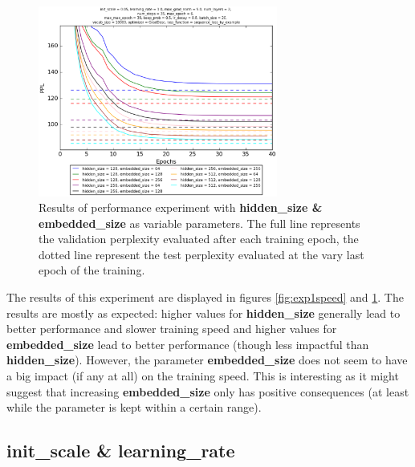 \documentclass[10pt,a4paper,titlepage]{article}
\begin{document}
\begin{figure}[H]
	\begin{center}
		\includegraphics[width=0.70\textwidth]{hidembperf.eps}
		\caption{Results of performance experiment with \textbf{hidden\_size \& embedded\_size} as variable parameters. The full line represents the validation perplexity evaluated after each training epoch, the dotted line represent the test perplexity evaluated at the vary last epoch of the training.}
		\label{fig:exp1perf}
	\end{center}	
\end{figure}

The results of this experiment are displayed in figures \ref{fig:exp1speed} and \ref{fig:exp1perf}. The results are mostly as expected: higher values for \textbf{hidden\_size} generally lead to better performance and slower training speed and higher values for \textbf{embedded\_size} lead to better performance (though less impactful than \textbf{hidden\_size}). However, the parameter \textbf{embedded\_size} does not seem to have a big impact (if any at all) on the training speed. This is interesting as it might suggest that increasing \textbf{embedded\_size} only has positive consequences (at least while the parameter is kept within a certain range).

\subsection{init\_scale \& learning\_rate}
\end{document}
